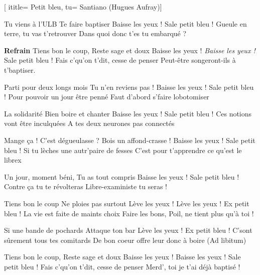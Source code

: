  [
ititle= {Petit bleu},
tu= {Santiano (Hugues Aufray)}]


\beginverse
Tu viens à l'ULB
Te faire baptiser
Baisse les yeux ! Sale petit bleu !
Gueule en terre, tu vas t'retrouver
Dans quoi donc t'es tu embarqué ?
\endverse

\beginchorus
\textbf {Refrain}
Tiens bon le coup,
Reste sage et doux
Baisse les yeux ! \emph {Baisse les yeux !} Sale petit bleu !
Fais c'qu'on t'dit, cesse de penser
Peut-être songeront-ils à t'baptiser.
\endchorus

\beginverse
Parti pour deux longs mois
Tu n'en reviens pas !
Baisse les yeux ! Sale petit bleu !
Pour pouvoir un jour être penné
Faut d'abord s'faire lobotomiser
\endverse

\beginverse
La solidarité
Bien boire et chanter
Baisse les yeux ! Sale petit bleu !
Ces notions vont être inculquées
A tes deux neurones pas connectés
\endverse

\beginverse
Mange ça ! C'est dégueulasse ?
Bois un affond-crasse !
Baisse les yeux ! Sale petit bleu !
Si tu lèches une autr'paire de fesses
C'est pour t'apprendre ce qu'est le librex
\endverse

\beginverse
Un jour, moment béni,
Tu as tout compris
Baisse les yeux ! Sale petit bleu !
Contre ça tu te révolteras
Libre-exaministe tu seras !
\endverse

\beginchorus
Tiens bon le coup
Ne ploies pas surtout
Lève les yeux ! Lève les yeux ! Ex petit bleu !
La vie est faite de maints choix
Faire les bons, Poil, ne tient plus qu'à toi !
\endchorus

\beginverse
Si une bande de pochards
Attaque ton bar
Lève les yeux ! Ex petit bleu !
C'sont sûrement tous tes comitards
De bon coeur offre leur donc à boire
(Ad libitum)
\endverse

\beginverse
Tiens bon le coup,
Reste sage et doux
Baisse les yeux ! Baisse les yeux ! Sale petit bleu !
Fais c'qu'on t'dit, cesse de penser
Merd', toi je t'ai déjà baptisé !
\endverse

\endsong
